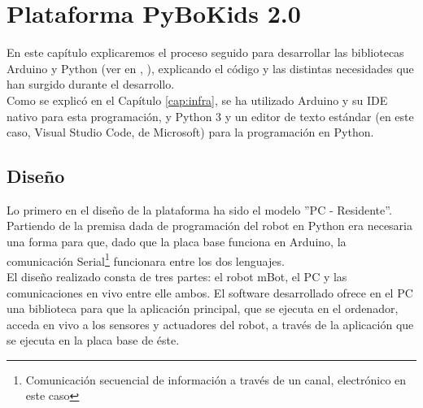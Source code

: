 \chapter{Plataforma PyBoKids 2.0}
\label{cap:PyBoKids}
En este capítulo explicaremos el proceso seguido para desarrollar las bibliotecas Arduino y Python (ver en \cite{arduinolenguaje}, \cite{PythonRef}), explicando el código y las distintas necesidades que han surgido durante el desarrollo. \\
Como se explicó en el Capítulo \ref{cap:infra}, se ha utilizado Arduino  y su IDE nativo para esta programación, y Python 3 y un editor de texto estándar (en este caso, Visual Studio Code, de Microsoft) para la programación en Python. 

\section{Diseño}\label{sec:diseño}
Lo primero en el diseño de la plataforma ha sido el modelo ''PC - Residente''. Partiendo de la premisa dada de programación del robot en Python era necesaria una forma para que, dado que la placa base funciona en Arduino, la comunicación Serial\footnote{Comunicación secuencial de información a través de un canal, electrónico en este caso} funcionara entre los dos lenguajes. \\
El diseño realizado consta de tres partes: el robot mBot, el PC y las comunicaciones en vivo entre elle ambos. El software desarrollado ofrece en el PC una biblioteca para que la aplicación principal, que se ejecuta en el ordenador, acceda en vivo a los sensores y actuadores del robot, a través de la aplicación que se ejecuta en la placa base de éste.\\

